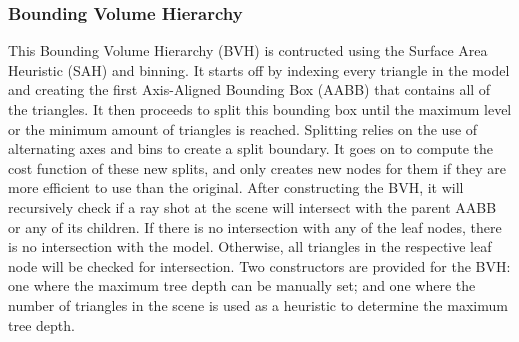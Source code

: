 \documentclass{article}
\begin{document}
    \subsubsection{Bounding Volume Hierarchy}
    This Bounding Volume Hierarchy (BVH) is contructed using the Surface Area Heuristic (SAH) and binning. 
    It starts off by indexing every triangle in the model and creating the first Axis-Aligned Bounding Box 
    (AABB) that contains all of the triangles. It then proceeds to split this bounding box until the maximum 
    level or the minimum amount of triangles is reached. Splitting relies on the use of alternating axes and 
    bins to create a split boundary. It goes on to compute the cost function of these new splits, and only 
    creates new nodes for them if they are more efficient to use than the original. After constructing the 
    BVH, it will recursively check if a ray shot at the scene will intersect with the parent AABB or any of 
    its children. If there is no intersection with any of the leaf nodes, there is no intersection with the 
    model. Otherwise, all triangles in the respective leaf node will be checked for intersection.
    Two constructors are provided for the BVH: one where the maximum tree depth can be manually set;
    and one where the number of triangles in the scene is used as a heuristic to determine the maximum
    tree depth.
\end{document}
